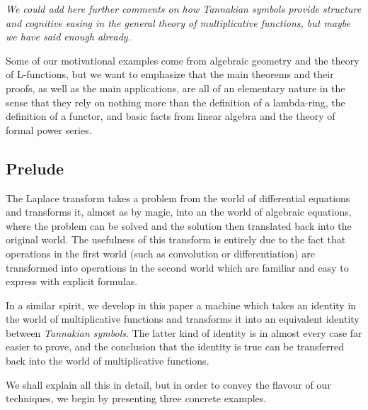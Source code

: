 \documentclass[a4paper]{article}
\begin{document}
\emph{We could add here further comments on how Tannakian symbols provide structure and cognitive easing in the general theory of multiplicative functions, but maybe we have said enough already.}

Some of our motivational examples come from algebraic geometry and the theory of L-functions, but we want to emphasize that the main theorems and their proofs, as well as the main applications, are all of an elementary nature in the sense that they rely on nothing more than the definition of a lambda-ring, the definition of a functor, and basic facts from linear algebra and the theory of formal power series.

\subsection{Prelude}

The Laplace transform takes a problem from the world of differential equations and transforms it, almost as by magic, into an the world of algebraic equations, where the problem can be solved and the solution then translated back into the original world. The usefulness of this transform is entirely due to the fact that operations in the first world (such as convolution or differentiation) are transformed into operations in the second world which are familiar and easy to express with explicit formulas.

In a similar spirit, we develop in this paper a machine which takes an identity in the world of multiplicative functions and transforms it into an equivalent identity between \emph{Tannakian symbols}. The latter kind of identity is in almost every case far easier to prove, and the conclusion that the identity is true can be transferred back into the world of multiplicative functions.

We shall explain all this in detail, but in order to convey the flavour of our techniques, we begin by presenting three concrete examples. 
\end{document}
